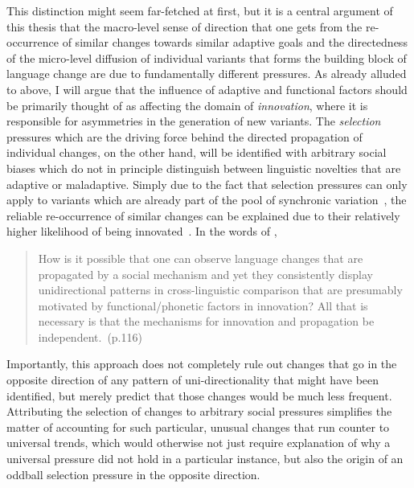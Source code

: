 This distinction might seem far-fetched at first, but it is a central argument of this thesis that the macro-level sense of direction that one gets from the re-occurrence of similar changes towards similar adaptive goals and the directedness of the micro-level diffusion of individual variants that forms the building block of language change are due to fundamentally different pressures.
As already alluded to above, I will argue that the influence of adaptive and functional factors should be primarily thought of as affecting the domain of \emph{innovation}, where it is responsible for asymmetries in the generation of new variants. The \emph{selection} pressures which are the driving force behind the directed propagation of individual changes, on the other hand, will be identified with arbitrary social biases which do not in principle distinguish between linguistic novelties that are adaptive or maladaptive.
Simply due to the fact that selection pressures can only apply to variants which are already part of the pool of synchronic variation~\citep{Ohala1989}, the reliable re-occurrence of similar changes can be explained due to their relatively higher likelihood of being innovated~\citep{Joseph2013}. In the words of \citet{Croft2006},

\begin{quote}
How is it possible that one can observe language changes that are propagated by a social mechanism and yet they consistently display unidirectional patterns in cross-linguistic comparison that are presumably motivated by functional/phonetic factors in innovation? All that is necessary is that the mechanisms for innovation and propagation be independent.~(p.116)
\end{quote}

Importantly, this approach does not completely rule out changes that go in the opposite direction of any pattern of uni-directionality that might have been identified, but merely predict that those changes would be much less frequent. Attributing the selection of changes to arbitrary social pressures simplifies the matter of accounting for such particular, unusual changes that run counter to universal trends, which would otherwise not just require explanation of why a universal pressure did not hold in a particular instance, but also the origin of an oddball selection pressure in the opposite direction.

